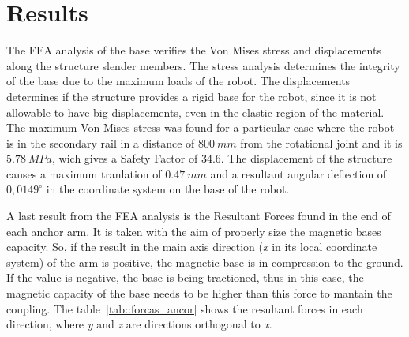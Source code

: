 \section{Results}





The FEA analysis of the base verifies the Von Mises stress and displacements
along the structure slender members. The stress analysis determines the
integrity of the base due to the maximum loads of the robot. The displacements
determines if the structure provides a rigid base for the robot, since it is not
allowable to have big displacements, even in the elastic region of the material.
The maximum Von Mises stress was found for a particular case where the robot is
in the secondary rail in a distance of $800~mm$ from the rotational joint and
it is $5.78~MPa$, wich gives a Safety Factor of $34.6$. 
The displacement of the structure causes a maximum tranlation of $0.47~mm$ and a
resultant angular deflection of $0,0149^{\circ}$ in the coordinate system on
the base of the robot.

A last result from the FEA analysis is the Resultant Forces found in the end of
each anchor arm.
It is taken with the aim of properly size the magnetic bases capacity. So, if the
result in the main axis direction (\textit{x} in its local coordinate
system) of the arm is positive, the magnetic base is in compression to the
ground.
If the value is negative, the base is being tractioned, thus in this case, the magnetic capacity of the base needs to be
higher than this force to mantain the coupling. The
table~\ref{tab::forcas_ancor} shows the resultant forces in each direction,
where \textit{y} and \textit{z} are directions orthogonal to \textit{x}.



